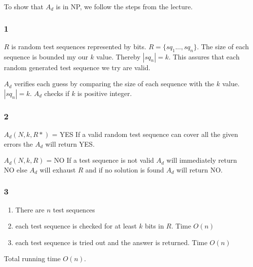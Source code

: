 \documentclass[11pt]{article}
\begin{document}
To show that $A_{d}$ is in NP, we follow the steps from the lecture.

\subsubsection*{1}
$R$ is random test sequences represented by bits. $R = \{ sq_{1} ..., sq_{n} \}$. The size of each sequence is bounded my our $k$ value. Thereby $|sq_{n}| = k$. This assures that each random generated test sequence we try are valid. \newline

$A_{d}$ verifies each guess by comparing the size of each sequence with the $k$ value. $|sq_{n}| = k$. $A_{d}$ checks if $k$ is positive integer. 

\subsubsection*{2}
$A_{d}(N, k, R*)$ = YES
If a valid random test sequence can cover all the given errors the $A_{d}$ will return YES.

$A_{d}(N, k, R)$ = NO
If a test sequence is not valid $A_{d}$ will immediately return NO else $A_{d}$ will exhaust $R$ and if no solution is found $A_{d}$ will return NO.  

\subsubsection*{3}
\begin{enumerate}
	\item There are $n$ test sequences
	\item each test sequence is checked for at least $k$ bits in $R$. Time $O(n)$
	\item each test sequence is tried out and the answer is returned. Time $O(n)$
\end{enumerate}

Total running time $O(n)$.
\end{document}
